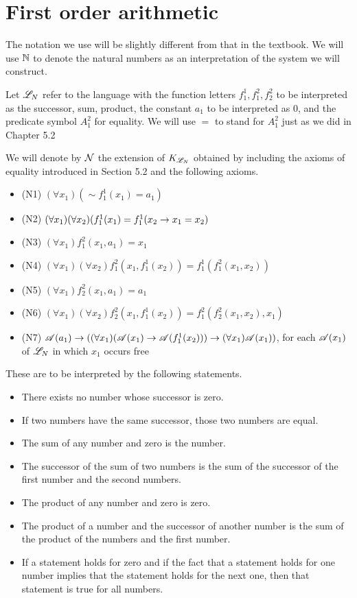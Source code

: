 \section{First order arithmetic}

The notation we use will be slightly different from that in the textbook. We will use \(\mathbb{N}\) to denote the natural numbers as an interpretation of the system we will construct.

Let \(\mathscr{L}_{N}\) refer to the language with the function letters \(f^1_1, f^2_1, f^2_2\) to be interpreted as the successor, sum, product, the constant \(a_1\) to be interpreted as 0, and the predicate symbol \(A^2_1\) for equality. We will use \(=\) to stand for \(A^2_1\) just as we did in Chapter 5.2

We will denote by \(\mathcal{N}\) the extension of \(K_{\mathscr{L}_N}\) obtained by including the axioms of equality introduced in Section 5.2 and the following axioms.
\begin{itemize}
  \item (N1) \((\forall x_1)(\sim f^1_1(x_1) = a_1)\)
  \item (N2) \((\forall x_1)(\forall x_2)(f^1_1(x_1) = f^1_1(x_2 \rightarrow x_1 = x_2)\)
  \item (N3) \((\forall x_1)f^2_1(x_1, a_1) = x_1\)
  \item (N4) \((\forall x_1)(\forall x_2)f^2_1(x_1, f^1_1(x_2)) = f^1_1(f^2_1(x_1, x_2))\)
  \item (N5) \((\forall x_1)f^2_2(x_1, a_1) = a_1\)
  \item (N6) \((\forall x_1)(\forall x_2)f^2_2(x_1, f^1_1(x_2)) = f^2_1(f^2_2(x_1, x_2), x_1)\)
  \item (N7) \(\mathscr{A}(a_1) \rightarrow ((\forall x_1)(\mathscr{A}(x_1) \rightarrow \mathscr{A}(f^1_1(x_2))) \rightarrow (\forall x_1)\mathscr{A}(x_1))\), for each \wf{} \(\mathscr{A}(x_1)\) of \(\mathscr{L}_N\) in which \(x_1\) occurs free
\end{itemize}

These are to be interpreted by the following statements.
\begin{itemize}
  \item There exists no number whose successor is zero.
  \item If two numbers have the same successor, those two numbers are equal.
  \item The sum of any number and zero is the number.
  \item The successor of the sum of two numbers is the sum of the successor of the first number and the second numbers.
  \item The product of any number and zero is zero.
  \item The product of a number and the successor of another number is the sum of the product of the numbers and the first number.
  \item If a statement holds for zero and if the fact that a statement holds for one number implies that the statement holds for the next one, then that statement is true for all numbers.
\end{itemize}

